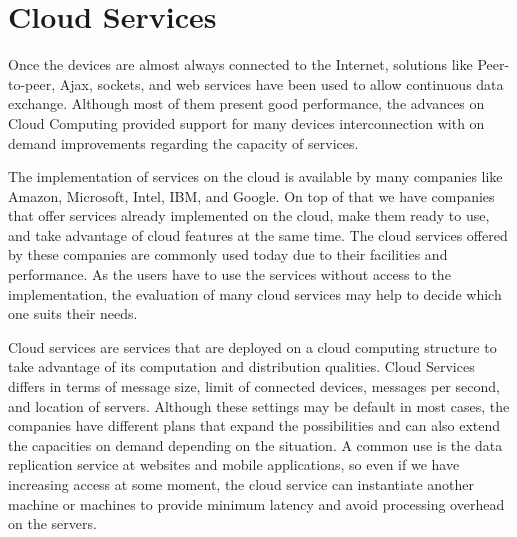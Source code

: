 





\section{Cloud Services}
\label{sec:cloudservices}

Once the devices are almost always connected to the Internet, solutions like Peer-to-peer, Ajax, sockets, and web services have been used to allow continuous data exchange.
Although most of them present good performance, the advances on Cloud Computing provided support for many devices interconnection with on demand improvements regarding the capacity of services.

The implementation of services on the cloud is available by many companies like Amazon, Microsoft, Intel, IBM, and Google.
On top of that we have companies that offer services already implemented on the cloud, make them ready to use, and take advantage of cloud features at the same time.
The cloud services offered by these companies are commonly used today due to their facilities and performance.
As the users have to use the services without access to the implementation, the evaluation of many cloud services may help to decide which one suits their needs.

Cloud services are services that are deployed on a cloud computing structure to take advantage of its computation and distribution qualities.
Cloud Services differs in terms of message size, limit of connected devices, messages per second, and location of servers.
Although these settings may be default in most cases, the companies have different plans that expand the possibilities and can also extend the capacities on demand depending on the situation.
A common use is the data replication service at websites and mobile applications, so even if we have increasing access at some moment, the cloud service can instantiate another machine or machines to provide minimum latency and avoid processing overhead on the servers.

